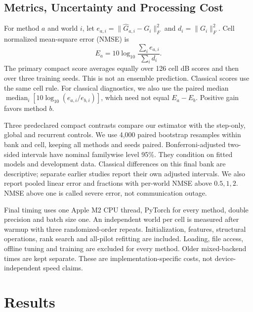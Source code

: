 \documentclass[10pt,journal,letterpaper]{IEEEtran}
\DeclareMathOperator{\median}{median}
\begin{document}
\subsection{Metrics, Uncertainty and Processing Cost}
For method $a$ and world $i$, let $e_{a,i}=\|\widehat G_{a,i}-G_i\|_F^2$ and $d_i=\|G_i\|_F^2$. Cell normalized mean-square error (NMSE) is
\begin{equation}
 E_a=10\log_{10}\frac{\sum_i e_{a,i}}{\sum_i d_i}.
 \label{eq:nmse}
\end{equation}
The primary compact score averages equally over 126 cell dB scores and then over three training seeds. This is not an ensemble prediction. Classical scores use the same cell rule. For classical diagnostics, we also use the paired median $\median_i[10\log_{10}(e_{a,i}/e_{b,i})]$, which need not equal $E_a-E_b$. Positive gain favors method $b$.

Three predeclared compact contrasts compare our estimator with the step-only, global and recurrent controls. We use 4,000 paired bootstrap resamples within bank and cell, keeping all methods and seeds paired. Bonferroni-adjusted two-sided intervals have nominal familywise level 95\%. They condition on fitted models and development data. Classical differences on this final bank are descriptive; separate earlier studies report their own adjusted intervals. We also report pooled linear error and fractions with per-world NMSE above $0.5,1,2$. NMSE above one is called severe error, not communication outage.

Final timing uses one Apple M2 CPU thread, PyTorch for every method, double precision and batch size one. An independent world per cell is measured after warmup with three randomized-order repeats. Initialization, features, structural operations, rank search and all-pilot refitting are included. Loading, file access, offline tuning and training are excluded for every method. Older mixed-backend times are kept separate. These are implementation-specific costs, not device-independent speed claims.

\section{Results}
\end{document}
